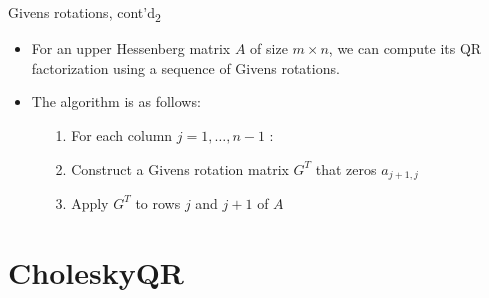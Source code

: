 \documentclass[t,usepdftitle=false]{beamer}
\begin{document}
\begin{frame}{Givens rotations, cont'd\textsubscript{2}}
\begin{itemize}
\item For an upper Hessenberg matrix $A$ of size $m \times n$, we can compute its QR factorization using a sequence of Givens rotations.
\item The algorithm is as follows:
\begin{itemize}
\item[1.] For each column $j=1,\dots,n-1$ :\vspace{.1cm}
\item[2.]\hspace{.4cm}Construct a Givens rotation matrix $G^T$ that zeros $a_{j+1,j}$\vspace{.1cm}
\item[3.]\hspace{.4cm}Apply $G^T$ to rows $j$ and $j+1$ of $A$
\end{itemize}
\end{itemize}
\end{frame}

\section{CholeskyQR}
\end{document}
